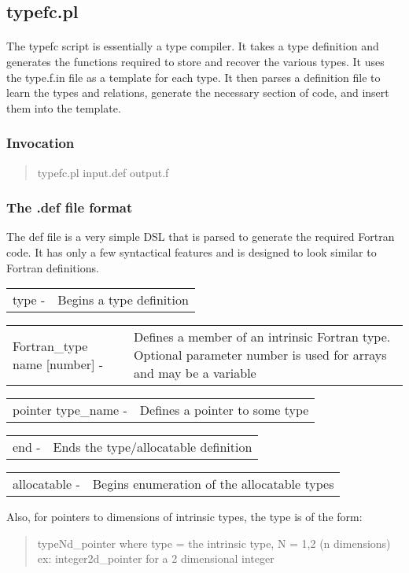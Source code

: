 \documentclass{article}
\begin{document}
\subsection{typefc.pl}
\label{sec:typefc}
\paragraph{}
The typefc script is essentially a type compiler. It takes a type definition and generates the functions required to store and recover the various types. It uses the type.f.in file as a template for each type. It then parses a definition file to learn the types and relations, generate the necessary section of code, and insert them into the template.
\subsubsection{Invocation}
\begin{quote}
   typefc.pl input.def output.f
\end{quote}
\subsubsection{The .def file format}
\newcommand{\syn}[2]{
   \begin{tabular}{lp{0.7\textwidth}}
      #1 - & #2
   \end{tabular}
}
The def file is a very simple DSL that is parsed to generate the required Fortran code. It has only a few syntactical features and is designed to look similar to Fortran definitions.
\begin{list}{}{}
\item \syn {type}{Begins a type definition}
\item \syn{Fortran\_type name [number]}{Defines a member of an intrinsic Fortran type. Optional parameter number is used for arrays and may be a variable}
\item \syn{pointer type\_name}{Defines a pointer to some type}
\item \syn{end}{Ends the type/allocatable definition}
\item \syn{allocatable}{Begins enumeration of the allocatable types}
\end{list}
Also, for pointers to dimensions of intrinsic types, the type is of the form:
\begin{quote}
   typeNd\_pointer where type = the intrinsic type, N = 1,2 (n dimensions) \\
   ex: integer2d\_pointer for a 2 dimensional integer
\end{quote}
\end{document}
